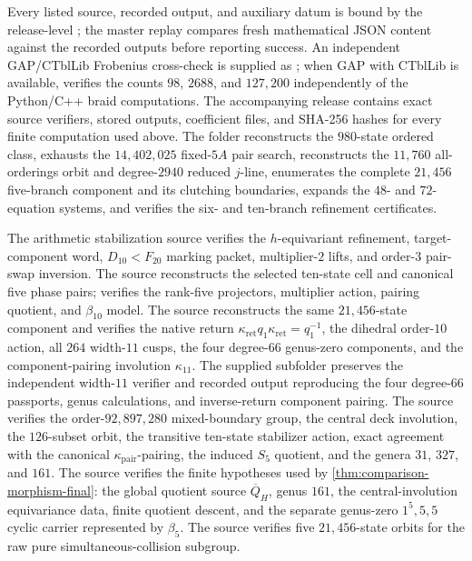 \documentclass[11pt]{article}
\theoremstyle{remark}
\begin{document}
Every listed source, recorded output, and auxiliary datum is bound by the release-level ; the master replay compares fresh mathematical JSON content against the recorded outputs before reporting success.  An independent GAP/CTblLib Frobenius cross-check is supplied as ; when GAP with CTblLib is available,  verifies the counts $98$, $2688$, and $127{,}200$ independently of the Python/C++ braid computations.
The accompanying release contains exact source verifiers, stored outputs, coefficient files, and SHA-256 hashes for every finite computation used above.  The folder  reconstructs the $980$-state ordered class, exhausts the $14{,}402{,}025$ fixed-$5A$ pair search, reconstructs the $11{,}760$ all-orderings orbit and degree-$2940$ reduced $j$-line, enumerates the complete $21{,}456$ five-branch component and its clutching boundaries, expands the $48$- and $72$-equation systems, and verifies the six- and ten-branch refinement certificates.

The arithmetic stabilization source  verifies the $h$-equivariant refinement, target-component word, $D_{10}<F_{20}$ marking packet, multiplier-$2$ lifts, and order-$3$ pair-swap inversion.  The source  reconstructs the selected ten-state cell and canonical five phase pairs;  verifies the rank-five projectors, multiplier action, pairing quotient, and $\beta_{10}$ model.  The source  reconstructs the same $21{,}456$-state component and verifies the native return $\kappa_{\mathrm{ret}}q_1\kappa_{\mathrm{ret}}=q_1^{-1}$, the dihedral order-$10$ action, all $264$ width-$11$ cusps, the four degree-$66$ genus-zero components, and the component-pairing involution $\kappa_{11}$.  The supplied subfolder  preserves the independent width-$11$ verifier and recorded output reproducing the four degree-$66$ passports, genus calculations, and inverse-return component pairing.  The source  verifies the order-$92{,}897{,}280$ mixed-boundary group, the central deck involution, the $126$-subset orbit, the transitive ten-state stabilizer action, exact agreement with the canonical $\kappa_{\mathrm{pair}}$-pairing, the induced $S_5$ quotient, and the genera $31$, $327$, and $161$.  The source  verifies the finite hypotheses used by \cref{thm:comparison-morphism-final}: the global quotient source $\overline Q_H$, genus $161$, the central-involution equivariance data, finite quotient descent, and the separate genus-zero $1^5,5,5$ cyclic carrier represented by $\beta_5$.  The source  verifies five $21{,}456$-state orbits for the raw pure simultaneous-collision subgroup.
\end{document}
